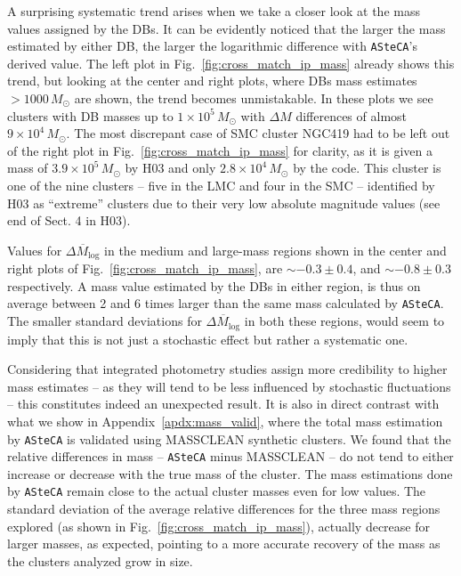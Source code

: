 \documentclass[draft]{aa}
\begin{document}
A surprising systematic trend arises when we take a closer look at the mass
values assigned by the DBs. It can be evidently noticed that the larger the
mass estimated by either DB, the larger the logarithmic difference with 
\texttt{ASteCA}'s derived value. The left plot in
Fig.~\ref{fig:cross_match_ip_mass} already shows this trend, but looking
at the center and right plots, where DBs mass estimates ${>}1000\,M_{\odot}$ are
shown, the trend becomes unmistakable.
In these plots we see clusters with DB masses up to $1{\times}10^5\,M_{\odot}$
with $\Delta M$ differences of almost $9{\times}10^4\,M_{\odot}$.
The most discrepant case of SMC cluster NGC419 had to be left out of the right
plot in Fig.~\ref{fig:cross_match_ip_mass} for clarity, as it is given a mass of
$3.9{\times}10^5\,M_{\odot}$ by H03 and only $2.8{\times}10^4\,M_{\odot}$ by the
code. This cluster is one of the nine clusters -- five in the LMC and four in
the SMC -- identified by H03 as ``extreme'' clusters due to their very low
absolute magnitude values (see end of Sect. 4 in H03).

Values for $\overline{\Delta M_{\log}}$ in the medium and large-mass regions
shown in the center and right plots of Fig.~\ref{fig:cross_match_ip_mass}, are
${\sim-}0.3{\pm}0.4$, and ${\sim-}0.8{\pm}0.3$ respectively.
A mass value estimated by the DBs in either region, is thus on average between 2
and 6 times larger than the same mass calculated by \texttt{ASteCA}.
The smaller standard deviations for $\overline{\Delta M_{\log}}$ in both these
regions, would seem to imply that this is not just a stochastic effect but
rather a systematic one.

Considering that integrated photometry studies assign more credibility to higher
mass estimates -- as they will tend to be less influenced by stochastic
fluctuations -- this constitutes indeed an unexpected result.
%
It is also in direct contrast with what we show in
Appendix~\ref{apdx:mass_valid}, where the total mass estimation by
\texttt{ASteCA} is validated using MASSCLEAN synthetic clusters. We found that
the relative differences in mass -- \texttt{ASteCA} minus MASSCLEAN -- do not
tend to either increase or decrease with the true mass of the cluster. The mass
estimations done by \texttt{ASteCA} remain close to the actual cluster masses
even for low values. The standard deviation of the average relative differences
for the three mass regions explored (as shown in
Fig.~\ref{fig:cross_match_ip_mass}), actually decrease for larger masses, as
expected, pointing to a more accurate recovery of the mass as the clusters
analyzed grow in size.\\
\end{document}
